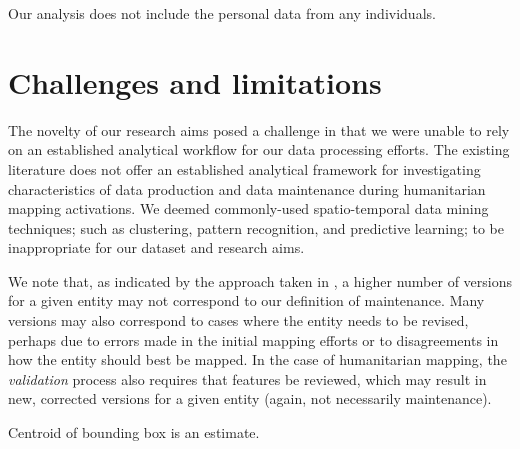 Our analysis does not include the personal data from any individuals. 

\section{Challenges and limitations}

The novelty of our research aims posed a challenge in that we were unable to rely on an established analytical workflow for our data processing efforts. The existing literature does not offer an established analytical framework for investigating characteristics of data production and data maintenance during humanitarian mapping activations. We deemed commonly-used spatio-temporal data mining techniques; such as clustering, pattern recognition, and predictive learning; to be inappropriate for our dataset and research aims. 

We note that, as indicated by the approach taken in \textcite{mooney_characteristics_2012}, a higher number of versions for a given entity may not correspond to our definition of maintenance. Many versions may also correspond to cases where the entity needs to be revised, perhaps due to errors made in the initial mapping efforts or to disagreements in how the entity should best be mapped. In the case of humanitarian mapping, the \textit{validation} process also requires that features be reviewed, which may result in new, corrected versions for a given entity (again, not necessarily maintenance). 

Centroid of bounding box is an estimate. 